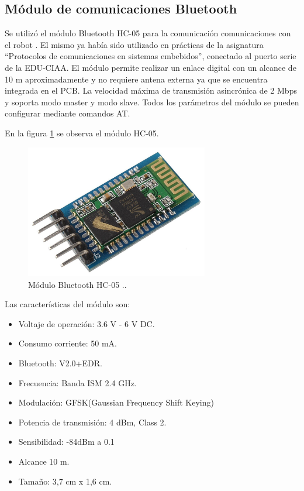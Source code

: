 \subsection{Módulo de comunicaciones Bluetooth}


Se utilizó el módulo Bluetooth HC-05 para la comunicación comunicaciones con el robot \citep{HC05}. El mismo ya había sido utilizado en  prácticas de la asignatura “Protocolos de comunicaciones en sistemas embebidos”, conectado al puerto serie de la EDU-CIAA. 
El módulo permite realizar un enlace digital con un alcance de 10 m aproximadamente y no requiere antena externa ya que se encuentra integrada en el PCB. La velocidad máxima de transmisión asincrónica de 2 Mbps y soporta modo master y modo slave.
Todos los parámetros del módulo se pueden configurar mediante comandos AT. 

En la figura \ref{fig:moduloHC05} se observa el módulo HC-05.


\begin{figure}[h]
	\centering
	\includegraphics[width=8cm]{./Figures/HC05.jpeg}
	\caption{Módulo Bluetooth HC-05 .\protect\footnotemark.}
	\label{fig:moduloHC05}
\end{figure}



Las características del módulo son:
\begin{itemize}
	\item Voltaje de operación: 3.6 V - 6 V DC.
	\item Consumo corriente: 50 mA.
	\item Bluetooth: V2.0+EDR.
	\item Frecuencia: Banda ISM 2.4 GHz.
	\item Modulación: GFSK(Gaussian Frequency Shift Keying)
	\item Potencia de transmisión: 4 dBm, Class 2.
	\item Sensibilidad: -84dBm a 0.1%
	\item Alcance 10 m.
	\item Tamaño: 3,7 cm x 1,6 cm.
\end{itemize}




